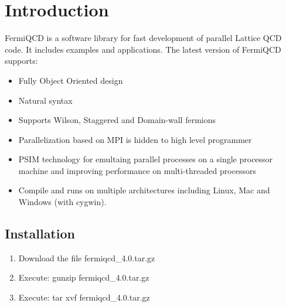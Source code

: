 





\section{Introduction}

FermiQCD is a software library for fast development of parallel Lattice QCD
code. It includes examples and applications. The latest version of FermiQCD
supports:

\begin{itemize}
\item  Fully Object Oriented design

\item  Natural syntax

\item  Supports Wilson, Staggered and Domain-wall fermions

\item  Parallelization based on MPI is hidden to high level programmer

\item  PSIM technology for emultaing parallel processes on a single
processor machine and improving performance on multi-threaded processors

\item  Compile and runs on multiple architectures including Linux, Mac and
Windows (with cygwin).
\end{itemize}

\subsection{Installation}

\begin{enumerate}
\item  Download the file fermiqcd\_4.0.tar.gz

\item  Execute: gunzip fermiqcd\_4.0.tar.gz

\item  Execute: tar xvf fermiqcd\_4.0.tar.gz
\end{enumerate}

